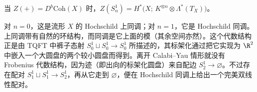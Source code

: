 \begin{theorem}
当 $Z(+)=D^{b}\mathrm{Coh}(X)$ 时，$Z(S^1_n)=H^{*}\bigl(X;\,K^{\otimes n}\otimes\Lambda^{*}(T_X)\bigr)$。
\end{theorem}

\begin{remark}
对 $n=0$，这是流形 $X$ 的 Hochschild 上同调；对 $n=1$，它是 Hochschild 同调。上同调带有自然的环结构，而同调是它上面的模（其余空间亦然）。这个代数结构正是由 TQFT 中裤子态射 $S^1_0\sqcup S^1_0\to S^1_0$ 所描述的，其标架化通过把它实现为 $\R^2$ 中嵌入一个大圆盘的两个较小圆盘而得到。离开 Calabi--Yau 情形就没有 Frobenius 代数结构，因为迹（即出向的标架化圆盘）来自配边 $S^1_2\to\varnothing$。不过存在配对 $S^1_1\sqcup S^1_1\to S^1_2$，再从它走到 $\varnothing$，便在 Hochschild 同调上给出一个完美双线性配对。
\end{remark}
